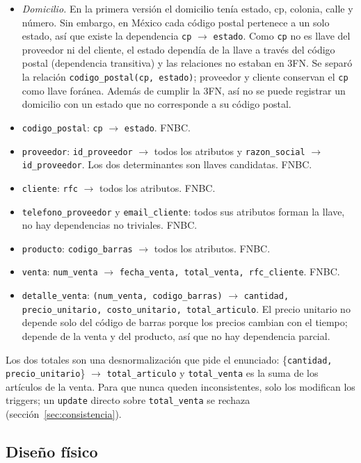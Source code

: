 \documentclass[12pt,a4paper]{article}
\newcommand{\cod}[1]{{\ttfamily\nolinkurl{#1}}}
\begin{document}
\begin{itemize}[leftmargin=1.2cm, itemsep=0.3em]
\item \textit{Domicilio.} En la primera versión el domicilio tenía estado, cp,
colonia, calle y número. Sin embargo, en México cada código postal pertenece a un
solo estado, así que existe la dependencia \cod{cp} $\rightarrow$ \cod{estado}. Como \cod{cp}
no es llave del proveedor ni del cliente, el estado dependía de la llave a través
del código postal (dependencia transitiva) y las relaciones no estaban en 3FN.
Se separó la relación \cod{codigo_postal(cp, estado)}; proveedor y cliente
conservan el \cod{cp} como llave foránea. Además de cumplir la 3FN, así no se
puede registrar un domicilio con un estado que no corresponde a su código postal.
\item \cod{codigo_postal}: \cod{cp} $\rightarrow$ \cod{estado}. FNBC.
\item \cod{proveedor}: \cod{id_proveedor} $\rightarrow$  todos los atributos y
\cod{razon_social} $\rightarrow$ \cod{id_proveedor}. Los dos determinantes son llaves
candidatas. FNBC.
\item \cod{cliente}: \cod{rfc} $\rightarrow$  todos los atributos. FNBC.
\item \cod{telefono_proveedor} y \cod{email_cliente}: todos sus atributos forman la
llave, no hay dependencias no triviales. FNBC.
\item \cod{producto}: \cod{codigo_barras} $\rightarrow$  todos los atributos. FNBC.
\item \cod{venta}: \cod{num_venta} $\rightarrow$ \cod{fecha_venta, total_venta, rfc_cliente}.
FNBC.
\item \cod{detalle_venta}: \cod{(num_venta, codigo_barras)} $\rightarrow$ \cod{cantidad,
precio_unitario, costo_unitario, total_articulo}. El precio unitario no depende
solo del código de barras porque los precios cambian con el tiempo; depende de la
venta y del producto, así que no hay dependencia parcial.
\end{itemize}

Los dos totales son una desnormalización que pide el enunciado:
\{\cod{cantidad, precio_unitario}\} $\rightarrow$ \cod{total_articulo} y \cod{total_venta}
es la suma de los artículos de la venta. Para que nunca queden inconsistentes, solo
los modifican los triggers; un \cod{update} directo sobre \cod{total_venta} se
rechaza (sección~\ref{sec:consistencia}).

\subsection{Diseño físico}
\end{document}
